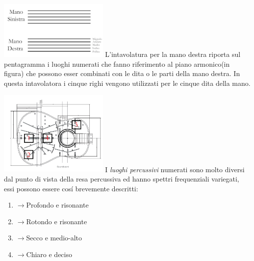 \documentclass[oneside]{article}
\begin{document}
\begin{multicols*}{2}
\includegraphics[width=0.4\textwidth]{img/legenda.png}
\noindent
L'intavolatura per la mano destra riporta sul pentagramma i luoghi numerati che fanno riferimento al piano armonico(in figura) che possono esser combinati con le dita o le parti della mano destra. In questa intavolatora i cinque righi vengono utilizzati per le cinque dita della mano. 

\includegraphics[width=0.4\textwidth]{img/luoghi_perc.png}
\noindent
I \textit{luoghi percussivi} numerati sono molto diversi dal punto di vista della resa percussiva ed hanno spettri frequenziali variegati, essi possono essere cosí brevemente descritti:
\begin{enumerate}
\item $\longrightarrow$Profondo e risonante 
\item $\longrightarrow$Rotondo e risonante
\item $\longrightarrow$Secco e medio-alto
\item $\longrightarrow$Chiaro e deciso
\end{enumerate}


\end{multicols*}
\end{document}
